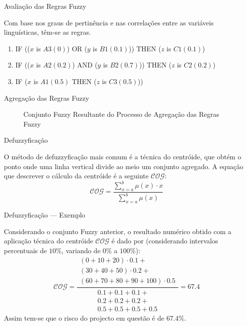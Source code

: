 \documentclass[portuges]{beamer}
\begin{document}
\begin{frame}{Avaliação das Regras Fuzzy}
	\begin{example}
		Com base nos graus de pertinência e nas correlações entre as variáveis linguísticas, têm-se as regras.
		\begin{enumerate}[<+->]
			\item \alert{IF} (($x$ is $A3 (0)$) \alert{OR} ($y$ is $B1 (0.1)$)) \alert{THEN} ($z$ is $C1 (0.1)$)
			\item IF (($x$ is $A2 (0.2)$) \alert{AND} ($y$ is $B2 (0.7)$)) THEN ($z$ is $C2 (0.2)$)
			\item IF ($x$ is $A1 (0.5)$ THEN ($z$ is $C3 (0.5)$))
		\end{enumerate}
	\end{example}
\end{frame}

\begin{frame}{Agregação das Regras Fuzzy}
	\begin{figure}
			\centering
			\caption{Conjunto Fuzzy Resultante do Processo de Agregação das Regras Fuzzy}
		\end{figure}		
\end{frame}

\begin{frame}{Defuzzyficação}
	\begin{definition}[Defuzzyficação]
		O método de defuzzyficação mais comum é a técnica do centróide, que 
		obtém o ponto onde uma linha vertical divide ao meio um conjunto agregado.
		A equação que descrever o cálculo da centróide é a seguinte $\mathcal{COG}$:
		$$
			\mathcal{COG} = \frac{\sum_{x=a}^{b}\mu(x) \cdot x}{\sum_{x=a}^{b}\mu(x)}
		$$
	\end{definition}
\end{frame}

\begin{frame}{Defuzzyficação --- Exemplo}
\begin{example}
Considerando o conjunto Fuzzy anterior, o resultado numérico obtido com a aplicação técnica do centróide $\mathcal{COG}$ é dado
por (considerando intervalos percentuais de $10\%$, variando de $0\%$ a $100\%$):
		$$
			\mathcal{COG} = \frac{ \begin{array}{c}
						(0 + 10 + 20) \cdot 0.1 + \\
						(30 + 40 +50) \cdot 0.2 + \\
						(60 + 70 + 80 + 90 + 100)\cdot 0.5 
						\end{array}}
					{\begin{array}{c}
						0.1 + 0.1 + 0.1 + \\
						0.2 + 0.2 + 0.2 + \\
						0.5 + 0.5 + 0.5 + 0.5
					 \end{array}} = 67.4
		$$
Assim tem-se que o risco do projecto em questão é de $67.4\%$.
\end{example}
\end{frame}
\end{document}
